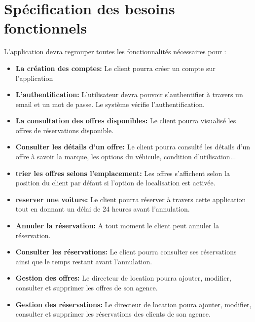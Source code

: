 \documentclass[12pt,a4paper]{report}
\begin{document}
		\section{Spécification des besoins fonctionnels}
L’application devra regrouper toutes les fonctionnalités nécessaires pour :\\
				\begin{itemize}
					\item \textbf{La création des comptes:} Le client pourra créer un compte sur l'application 
					\item \textbf{L'authentification:} L’utilisateur devra pouvoir s’authentifier à travers un email et un mot de passe. Le système vérifie l’authentification.
					\item \textbf{La consultation des offres disponibles:} Le client pourra visualisé les offres de réservations disponible.
					\item \textbf{Consulter les détails d'un offre:} Le client pourra consulté les détails d'un offre à savoir la marque, les options du véhicule, condition d'utilisation...
					\item \textbf{trier les offres selons l'emplacement:} Les offres s'affichent selon la position du client par défaut si l'option de localisation est activée.
					\item \textbf{reserver une voiture:} Le client pourra réserver à travers cette application tout en donnant un délai de 24 heures avant l'annulation.
					\item \textbf{Annuler la réservation:} A tout moment le client peut annuler la réservation.
					\item \textbf{Consulter les réservations:} Le client pourra consulter ses réservations ainsi que le temps restant avant l'annulation.
					\item \textbf{Gestion des offres:} Le directeur de location pourra ajouter, modifier, consulter et supprimer les offres de son agence.
					\item \textbf{Gestion des réservations:} Le directeur de location poura ajouter, modifier, consulter et supprimer les réservations des clients de son agence.
					 
				\end{itemize}
\end{document}
